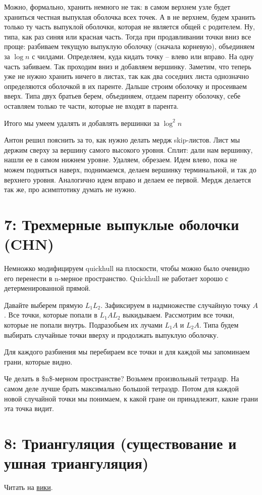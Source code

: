 \documentclass[11pt]{article}
\begin{document}
Можно, формально, хранить немного не так: в самом верхнем узле будет
храниться честная выпуклая оболочка всех точек. А в не верхнем,
будем хранить только ту часть выпуклой оболочки, которая не является
общей с родителем. Ну, типа, как раз синяя или красная часть. Тогда
при продавливании точки вниз все проще: разбиваем текущую выпуклую
оболочку (сначала корневую), объединяем за \(\log{n}\) с
чилдами. Определяем, куда кидать точку -- влево или вправо. На одну
часть забиваем. Так проходим вниз и добавляем вершинку. Заметим, что
теперь уже не нужно хранить ничего в листах, так как два соседних
листа однозначно определяются оболочкой в их паренте. Дальше строим
оболочку и просеиваем вверх. Типа двух братьев берем, объединяем,
отдаем паренту оболочку, себе оставляем только те части, которые не
входят в парента.

Итого мы умеем удалять и добавлять вершинки за \(\log^2{n}\)


Антон решил пояснить за то, как нужно делать мердж skip-листов. Лист
мы держим сверху за вершину самого высокого уровня. Сплит: дали нам
вершинку, нашли ее в самом нижнем уровне. Удаляем, обрезаем. Идем
влево, пока не можем подняться наверх, поднимаемся, делаем вершинку
терминальной, и так до верхнего уровня. Аналогично идем вправо и
делаем ее первой. Мердж делается так же, про асимптотику думать не
нужно.
\section{{\bfseries{}} 7:  Трехмерные выпуклые оболочки (CHN)}
\label{sec:orgheadline31}
Немножко модифицируем quickhull на плоскости, чтобы можно было
очевидно его перенести в n-мерное пространство. Quickhull не
работает хорошо с детерменированной прямой.

Давайте выберем прямую \(L_1L_2\). Зафиксируем в надмножестве случайную
точку \(A\). Все точки, которые попали в \(L_1AL_2\)
выкидываем. Рассмотрим все точки, которые не попали
внутрь. Подразобьем их лучами \(L_1A\) и \(L_2A\). Типа будем выбирать
случайные точки вверху и продолжать выпуклую оболочку.

Для каждого разбиения мы перебираем все точки и для каждой мы
запоминаем грани, которые видно.

Че делать в \$n\$-мерном пространстве? Возьмем произвольный
тетраэдр. На самом деле лучше брать максимально большой
тетраэдр. Потом для каждой новой случайной точки мы понимаем, к
какой гране он принадлежит, какие грани эта точка видит.
\section{{\bfseries{}} 8:  Триангуляция (существование и ушная триангуляция)}
\label{sec:orgheadline32}
Читать на \href{http://neerc.ifmo.ru/wiki/index.php?title=Триангуляция_полигонов_(ушная_\%2B_монотонная)#.D0.A2.D0.B5.D0.BE.D1.80.D0.B5.D0.BC.D0.B0_.D0.BE_.D1.81.D1.83.D1.89.D0.B5.D1.81.D1.82.D0.B2.D0.BE.D0.B2.D0.B0.D0.BD.D0.B8.D0.B8_.D1.82.D1.80.D0.B8.D0.B0.D0.BD.D0.B3.D1.83.D0.BB.D1.8F.D1.86.D0.B8.D0.B8}{вики}.
\end{document}
